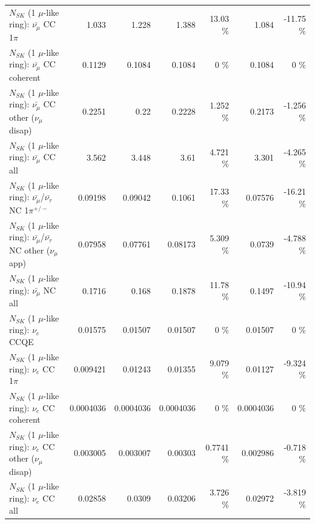 \begin{table}
\begin{tabular}{| l | r | r | r  r | r  r |}
                         $N_{SK}$ (1 $\mu$-like ring): $\bar{\nu_\mu}$ CC 1$\pi$ &           1.033 &           1.228 &           1.388 &    13.03 \%  &           1.084 &   -11.75 \%  \\ 
                       $N_{SK}$ (1 $\mu$-like ring): $\bar{\nu_\mu}$ CC coherent &          0.1129 &          0.1084 &          0.1084 &        0 \%  &          0.1084 &        0 \%  \\ 
        $N_{SK}$ (1 $\mu$-like ring): $\bar{\nu_\mu}$ CC other ($\nu_\mu$ disap) &          0.2251 &            0.22 &          0.2228 &    1.252 \%  &          0.2173 &   -1.256 \%  \\ 
                          $N_{SK}$ (1 $\mu$-like ring): $\bar{\nu_{\mu}}$ CC all &           3.562 &           3.448 &            3.61 &    4.721 \%  &           3.301 &   -4.265 \%  \\ 
\hline
  $N_{SK}$ (1 $\mu$-like ring): $\bar{\nu_\mu}$/$\bar{\nu_\tau}$ NC 1$\pi^{+/-}$ &         0.09198 &         0.09042 &          0.1061 &    17.33 \%  &         0.07576 &   -16.21 \%  \\ 
$N_{SK}$ (1 $\mu$-like ring): $\bar{\nu_\mu}$/$\bar{\nu_\tau}$ NC other ($\nu_\mu$ app) &         0.07958 &         0.07761 &         0.08173 &    5.309 \%  &          0.0739 &   -4.788 \%  \\ 
                          $N_{SK}$ (1 $\mu$-like ring): $\bar{\nu_{\mu}}$ NC all &          0.1716 &           0.168 &          0.1878 &    11.78 \%  &          0.1497 &   -10.94 \%  \\ 
\hline
\hline
\hline
                                      $N_{SK}$ (1 $\mu$-like ring): $\nu_e$ CCQE &         0.01575 &         0.01507 &         0.01507 &        0 \%  &         0.01507 &        0 \%  \\ 
                                 $N_{SK}$ (1 $\mu$-like ring): $\nu_e$ CC 1$\pi$ &        0.009421 &         0.01243 &         0.01355 &    9.079 \%  &         0.01127 &   -9.324 \%  \\ 
                               $N_{SK}$ (1 $\mu$-like ring): $\nu_e$ CC coherent &       0.0004036 &       0.0004036 &       0.0004036 &        0 \%  &       0.0004036 &        0 \%  \\ 
                $N_{SK}$ (1 $\mu$-like ring): $\nu_e$ CC other ($\nu_\mu$ disap) &        0.003005 &        0.003007 &         0.00303 &   0.7741 \%  &        0.002986 &   -0.718 \%  \\ 
                                  $N_{SK}$ (1 $\mu$-like ring): $\nu_{e}$ CC all &         0.02858 &          0.0309 &         0.03206 &    3.726 \%  &         0.02972 &   -3.819 \%  \\ 

\end{tabular}
\end{table}
